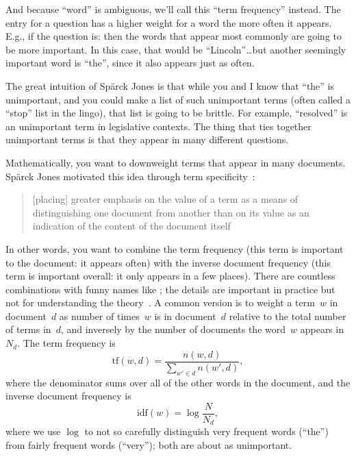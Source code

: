 And because ``word'' is ambiguous, we'll call this ``term frequency''
instead.
%
The entry for a question has a higher weight for a word the more often
it appears.
%
E.g., if the question is:
then the words that appear most commonly are going to be more important.
%
In this case, that would be ``Lincoln''\dots but another seemingly
important word is ``the'', since it also appears just as often.

The great intuition of Sp\"arck Jones is that while you and I know that
``the'' is unimportant, and you could make a list of such unimportant
terms (often called a ``stop'' list in the lingo), that list is going
to be brittle.
%
For example, ``resolved'' is an unimportant term in legislative
contexts.
%
The thing that ties together unimportant terms is that they appear in
many different questions.

Mathematically, you want to downweight terms that appear in many
documents.
%
Sp\"arck Jones motivated this idea through term
specificity~\citep{sparck1972statistical}:
\begin{quote}
[placing] greater emphasis on the value of a term as a means
of distinguishing one document from another than on its value as an
indication of the content of the document itself
\end{quote}
%
In other words, you want to combine the term frequency (this term is
important to the document: it appears often) with the inverse document
frequency (this term is important overall: it only appears in a few
places).
%
There are countless combinations with funny names like ;
the details are important in practice but not for understanding the
theory~\citep{robertson-09}.
%
A common version is to weight a term~$w$ in document~$d$
as number of times~$w$ is in document~$d$ relative to the total number
of terms in~$d$, and inversely by the number of documents the word~$w$
appears in~$N_d$.
%
The term frequency is
\begin{equation}
\mathrm{tf}(w,d) = \frac{n(w,d)}{\sum_{w' \in d} n(w',d)},
\end{equation}
where the denominator sums over all of the other words in the
document, and the inverse document frequency is
\begin{equation}
\mathrm{idf}(w) = \log \frac{N}{N_d},
\end{equation}
where we use $\log$ to not so carefully distinguish very frequent
words (``the'') from fairly frequent words (``very''); both are about
as unimportant.

